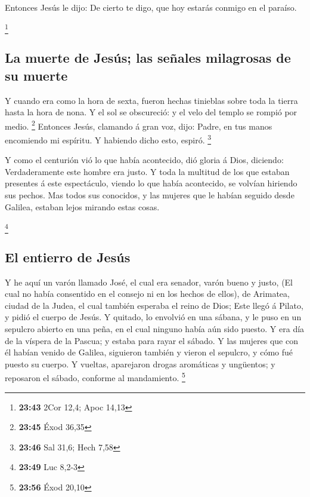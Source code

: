  Entonces Jesús le dijo: De cierto te digo, que hoy
estarás conmigo en el paraíso.

\footnote{\textbf{23:43} 2Cor 12,4; Apoc 14,13}

\hypertarget{la-muerte-de-jesuxfas-las-seuxf1ales-milagrosas-de-su-muerte}{%
\subsection{La muerte de Jesús; las señales milagrosas de su
muerte}\label{la-muerte-de-jesuxfas-las-seuxf1ales-milagrosas-de-su-muerte}}

 Y cuando era como la hora de sexta, fueron hechas
tinieblas sobre toda la tierra hasta la hora de nona.  Y
el sol se obscureció: y el velo del templo se rompió por medio.
\footnote{\textbf{23:45} Éxod 36,35}  Entonces Jesús,
clamando á gran voz, dijo: Padre, en tus manos encomiendo mi espíritu. Y
habiendo dicho esto, espiró. \footnote{\textbf{23:46} Sal 31,6; Hech
  7,58}

 Y como el centurión vió lo que había acontecido, dió
gloria á Dios, diciendo: Verdaderamente este hombre era justo.
 Y toda la multitud de los que estaban presentes á este
espectáculo, viendo lo que había acontecido, se volvían hiriendo sus
pechos.  Mas todos sus conocidos, y las mujeres que le
habían seguido desde Galilea, estaban lejos mirando estas cosas.

\footnote{\textbf{23:49} Luc 8,2-3}

\hypertarget{el-entierro-de-jesuxfas}{%
\subsection{El entierro de Jesús}\label{el-entierro-de-jesuxfas}}

 Y he aquí un varón llamado José, el cual era senador,
varón bueno y justo,  (El cual no había consentido en el
consejo ni en los hechos de ellos), de Arimatea, ciudad de la Judea, el
cual también esperaba el reino de Dios;  Este llegó á
Pilato, y pidió el cuerpo de Jesús.  Y quitado, lo
envolvió en una sábana, y le puso en un sepulcro abierto en una peña, en
el cual ninguno había aún sido puesto.  Y era día de la
víspera de la Pascua; y estaba para rayar el sábado.  Y
las mujeres que con él habían venido de Galilea, siguieron también y
vieron el sepulcro, y cómo fué puesto su cuerpo.  Y
vueltas, aparejaron drogas aromáticas y ungüentos; y reposaron el
sábado, conforme al mandamiento. \footnote{\textbf{23:56} Éxod 20,10}


